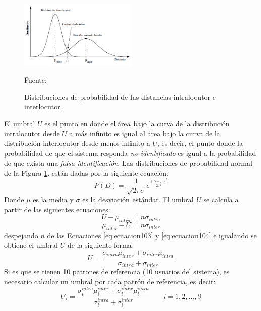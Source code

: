 \begin{enumerate}
\begin{figure}[H]
\begin{center}
\includegraphics[width=0.5\textwidth]{Imagenes/Cap2/image058}
\end{center}
\begin{center}
\vskip -0.5cm
\caption{\small{Distribuciones de probabilidad de las distancias intralocutor e interlocutor.}}
\label{fig:figura2.57}
{\small{Fuente: \cite{varela}}}
\end{center}
\end{figure}
\vskip -0.5cm
El umbral $U$ es el punto en donde el área bajo la curva de la distribución intralocutor desde $U$ a más infinito es igual al área bajo la curva de la distribución interlocutor desde menos infinito a $U$, es decir, el punto donde la probabilidad de que el sistema responda \textit{no identificado} es igual a la probabilidad de que exista una \textit{falsa identificación}. Las distribuciones de probabilidad normal de la Figura \ref{fig:figura2.57}. están dadas por la siguiente ecuación:
\begin{equation}
\label{eq:ecuacion102}
P(D) = \frac{1}{\sqrt{2 \pi \sigma }}e^{\frac{(D - \mu)^{2}}{2 \sigma^{2}}}
\end{equation}
Donde $\mu$ es la media y $\sigma$ es la desviación estándar. El umbral $U$ se calcula a partir de las siguientes ecuaciones:
\begin{equation}
\label{eq:ecuacion103}
U - \mu_{int ra} = n \sigma_{int ra}
\end{equation}
\begin{equation}
\label{eq:ecuacion104}
\mu_{int er} - U = n \sigma_{int er}
\end{equation}
despejando $n$ de las Ecuaciones \eqref{eq:ecuacion103} y \eqref{eq:ecuacion104} e igualando se obtiene el umbral $U$ de la siguiente forma:
\begin{equation}
\label{eq:ecuacion105}
U = \frac{\sigma_{int ra}\mu_{int er} + \sigma_{int er}\mu_{int ra}}{\sigma_{int ra} + \sigma_{int er}}
\end{equation}
Si es que se tienen 10 patrones de referencia (10 usuarios del sistema), es necesario calcular un umbral por cada patrón de referencia, es decir:
\begin{equation}
\label{eq:ecuacion106}
U_{i} = \frac{\sigma^{int ra}_{i} \mu^{int er}_{i} + \sigma^{int er}_{i} \mu^{int ra}_{i}}{\sigma^{int ra}_{i} + \sigma^{int er}_{i}}
\qquad
i = 1,2,...,9
\end{equation}
\end{enumerate}
\vskip 0.5cm
